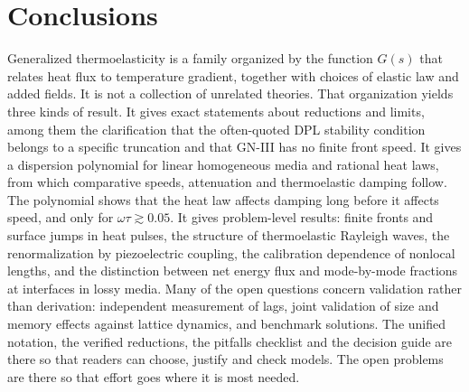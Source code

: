 \section{Conclusions}\label{sec:conclusions}
Generalized thermoelasticity is a family organized by the function $G(s)$ that relates heat flux to temperature gradient, together with choices of elastic law and added fields. It is not a collection of unrelated theories. That organization yields three kinds of result. It gives exact statements about reductions and limits, among them the clarification that the often-quoted DPL stability condition belongs to a specific truncation and that GN-III has no finite front speed. It gives a dispersion polynomial for linear homogeneous media and rational heat laws, from which comparative speeds, attenuation and thermoelastic damping follow. The polynomial shows that the heat law affects damping long before it affects speed, and only for $\omega\tau\gtrsim0.05$. It gives problem-level results: finite fronts and surface jumps in heat pulses, the structure of thermoelastic Rayleigh waves, the renormalization by piezoelectric coupling, the calibration dependence of nonlocal lengths, and the distinction between net energy flux and mode-by-mode fractions at interfaces in lossy media. Many of the open questions concern validation rather than derivation: independent measurement of lags, joint validation of size and memory effects against lattice dynamics, and benchmark solutions. The unified notation, the verified reductions, the pitfalls checklist and the decision guide are there so that readers can choose, justify and check models. The open problems are there so that effort goes where it is most needed.
